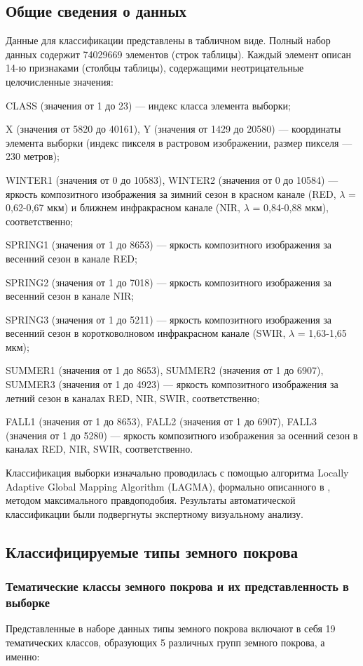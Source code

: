 \documentclass[14pt, a4paper, oneside]{extarticle}
\begin{document}
\subsection{Общие сведения о данных}
Данные для классификации представлены в табличном виде. Полный набор данных содержит 74029669 элементов (строк таблицы). Каждый элемент описан 14-ю признаками (столбцы таблицы), содержащими неотрицательные целочисленные значения:

CLASS (значения от 1 до 23) --- индекс класса элемента выборки;

X (значения от 5820 до 40161), Y (значения от 1429 до 20580) --- координаты элемента выборки (индекс пикселя в растровом изображении, размер пикселя --- 230 метров);

WINTER1 (значения от 0 до 10583), WINTER2 (значения от 0 до 10584) --- яркость композитного изображения за зимний сезон в красном канале (RED, $\lambda$ = 0,62-0,67 мкм) и ближнем инфракрасном канале (NIR, $\lambda$ = 0,84-0,88 мкм), соответственно;

SPRING1 (значения от 1 до 8653) --- яркость композитного изображения за весенний сезон в канале RED;

SPRING2 (значения от 1 до 7018) --- яркость композитного изображения за весенний сезон в канале NIR;

SPRING3 (значения от 1 до 5211) --- яркость композитного изображения за весенний сезон в коротковолновом инфракрасном канале (SWIR, $\lambda$ = 1,63-1,65 мкм);

SUMMER1 (значения от 1 до 8653), SUMMER2 (значения от 1 до 6907), SUMMER3 (значения от 1 до 4923) --- яркость композитного изображения за летний сезон в каналах RED, NIR, SWIR, соответственно;

FALL1 (значения от 1 до 8653), FALL2 (значения от 1 до 6907), FALL3 (значения от 1 до 5280) --- яркость композитного изображения за осенний сезон в каналах RED, NIR, SWIR, соответственно.

Классификация выборки изначально проводилась с помощью алгоритма Locally Adaptive Global Mapping Algorithm (LAGMA), формально описанного в \cite{land-cover-mapping-monograph}, методом максимального правдоподобия. Результаты автоматической классификации были подвергнуты экспертному визуальному анализу.

\subsection{Классифицируемые типы земного покрова}
\subsubsection{Тематические классы земного покрова и их представленность в выборке}
Представленные в наборе данных типы земного покрова включают в себя 19 тематических классов, образующих 5 различных групп земного покрова, а именно:
\end{document}
